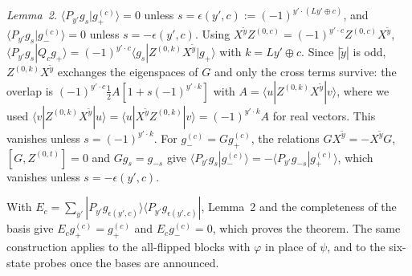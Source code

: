 \documentclass[aps,pra,twocolumn,superscriptaddress,nofootinbib]{revtex4-2}
\begin{document}
\emph{Lemma~2.} $\langle P_{y'}g_s|g^{(c)}_+\rangle=0$ unless $s=\epsilon(y',c):=(-1)^{y'\cdot(Ly'\oplus c)}$, and $\langle P_{y'}g_s|g^{(c)}_-\rangle=0$ unless $s=-\epsilon(y',c)$. Using $X^{\tilde y}Z^{(0,c)}=(-1)^{y'\cdot c}Z^{(0,c)}X^{\tilde y}$, $\langle P_{y'}g_s|Q_cg_+\rangle=(-1)^{y'\cdot c}\langle g_s|Z^{(0,k)}X^{\tilde y}|g_+\rangle$ with $k=Ly'\oplus c$. Since $|\tilde y|$ is odd, $Z^{(0,k)}X^{\tilde y}$ exchanges the eigenspaces of $G$ and only the cross terms survive: the overlap is $(-1)^{y'\cdot c}\tfrac12A[1+s(-1)^{y'\cdot k}]$ with $A=\langle u|Z^{(0,k)}X^{\tilde y}|v\rangle$, where we used $\langle v|Z^{(0,k)}X^{\tilde y}|u\rangle=\langle u|X^{\tilde y}Z^{(0,k)}|v\rangle=(-1)^{y'\cdot k}A$ for real vectors. This vanishes unless $s=(-1)^{y'\cdot k}$. For $g^{(c)}_-=Gg^{(c)}_+$, the relations $GX^{\tilde y}=-X^{\tilde y}G$, $[G,Z^{(0,t)}]=0$ and $Gg_s=g_{-s}$ give $\langle P_{y'}g_s|g^{(c)}_-\rangle=-\langle P_{y'}g_{-s}|g^{(c)}_+\rangle$, which vanishes unless $s=-\epsilon(y',c)$.

With $E_c=\sum_{y'}|P_{y'}g_{\epsilon(y',c)}\rangle\langle P_{y'}g_{\epsilon(y',c)}|$, Lemma~2 and the completeness of the basis give $E_cg^{(c)}_+=g^{(c)}_+$ and $E_cg^{(c)}_-=0$, which proves the theorem. The same construction applies to the all-flipped blocks with $\varphi$ in place of $\psi$, and to the six-state probes once the bases are announced.
\end{document}
